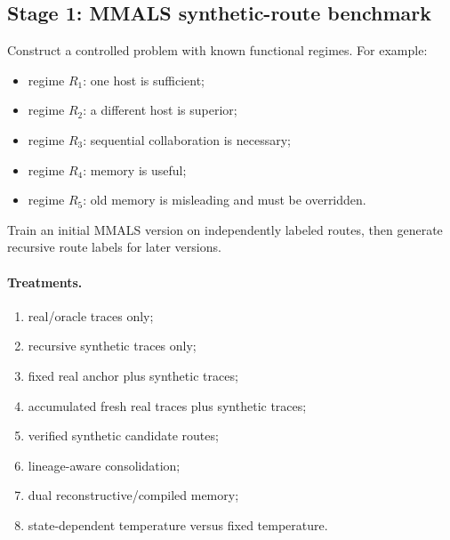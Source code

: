 \subsection{Stage 1: MMALS synthetic-route benchmark}

Construct a controlled problem with known functional regimes. For example:

\begin{itemize}[leftmargin=*]
  \item regime $R_1$: one host is sufficient;
  \item regime $R_2$: a different host is superior;
  \item regime $R_3$: sequential collaboration is necessary;
  \item regime $R_4$: memory is useful;
  \item regime $R_5$: old memory is misleading and must be overridden.
\end{itemize}

Train an initial MMALS version on independently labeled routes, then generate recursive route labels for later versions.

\paragraph{Treatments.}
\begin{enumerate}[leftmargin=*]
  \item real/oracle traces only;
  \item recursive synthetic traces only;
  \item fixed real anchor plus synthetic traces;
  \item accumulated fresh real traces plus synthetic traces;
  \item verified synthetic candidate routes;
  \item lineage-aware consolidation;
  \item dual reconstructive/compiled memory;
  \item state-dependent temperature versus fixed temperature.
\end{enumerate}

